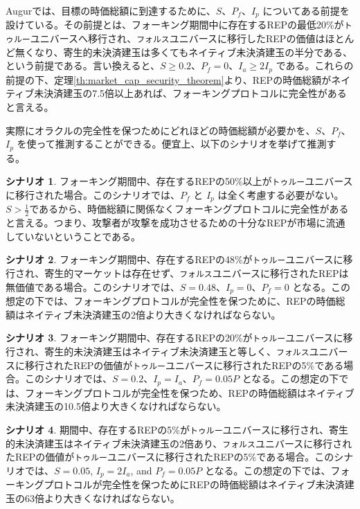 \documentclass[floatfix,reprint,nofootinbib,amsmath,amssymb,epsfig,pre,floats,letterpaper,groupedaffiliation]{revtex4-1}
\theoremstyle{definition}
\theoremstyle{definition}
\theoremstyle{definition}
\newtheorem{scenario}{シナリオ}
\begin{document}
\begin{appendix}
Augurでは、目標の時価総額に到達するために、$S$、$P_f$、$I_p$ についてある前提を設けている。その前提とは、フォーキング期間中に存在するREPの最低20\%が\texttt{トゥルー}ユニバースへ移行され、\texttt{フォルス}ユニバースに移行したREPの価値はほとんど無くなり、寄生的未決済建玉は多くてもネイティブ未決済建玉の半分である、という前提である。言い換えると、$S \geq 0.2$、$P_f=0$、$I_a \geq 2 I_p$ である。これらの前提の下、定理\ref{th:market_cap_security_theorem}より、REPの時価総額がネイティブ未決済建玉の7.5倍以上あれば、フォーキングプロトコルに完全性があると言える。

実際にオラクルの完全性を保つためにどれほどの時価総額が必要かを、$S$、$P_f$、$I_p$ を使って推測することができる。便宜上、以下のシナリオを挙げて推測する。

\begin{scenario}
フォーキング期間中、存在するREPの50\%以上が\texttt{トゥルー}ユニバースに移行された場合。このシナリオでは、$P_f$ と $I_p$ は全く考慮する必要がない。$S > \frac{1}{2}$であるから、時価総額に関係なくフォーキングプロトコルに完全性があると言える。つまり、攻撃者が攻撃を成功させるための十分なREPが市場に流通していないということである。
\end{scenario}

\begin{scenario}
フォーキング期間中、存在するREPの48\%が\texttt{トゥルー}ユニバースに移行され、寄生的マーケットは存在せず、\texttt{フォルス}ユニバースに移行されたREPは無価値である場合。このシナリオでは、$S=0.48$、$I_p=0$、$P_f=0$ となる。この想定の下では、フォーキングプロトコルが完全性を保つために、REPの時価総額はネイティブ未決済建玉の2倍より大きくなければならない。
\end{scenario}

\begin{scenario}
フォーキング期間中、存在するREPの20\%が\texttt{トゥルー}ユニバースに移行され、寄生的未決済建玉はネイティブ未決済建玉と等しく、\texttt{フォルス}ユニバースに移行されたREPの価値が\texttt{トゥルー}ユニバースに移行されたREPの5\%である場合。このシナリオでは、$S = 0.2$、$I_p = I_a$、$P_f = 0.05P$ となる。この想定の下では、フォーキングプロトコルが完全性を保つため、REPの時価総額はネイティブ未決済建玉の10.5倍より大きくなければならない。
\end{scenario}

\begin{scenario}
期間中、存在するREPの5\%が\texttt{トゥルー}ユニバースに移行され、寄生的未決済建玉はネイティブ未決済建玉の2倍あり、\texttt{フォルス}ユニバースに移行されたREPの価値が\texttt{トゥルー}ユニバースに移行されたREPの5\%である場合。このシナリオでは、$S = 0.05$, $I_p = 2I_a$, and $P_f = 0.05P$ となる。この想定の下では、フォーキングプロトコルが完全性を保つためにREPの時価総額はネイティブ未決済建玉の63倍より大きくなければならない。
\end{scenario}


\end{appendix}
\end{document}
